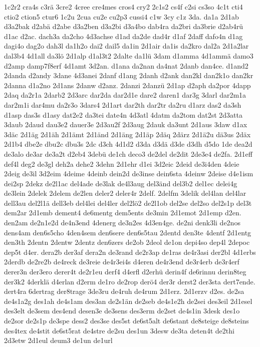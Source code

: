 {1c2r2
cra4s
c3rä
3cre2
4cree
cre4mes
cros4
cry2
2c1s2
cs4f
c2si
cs3so
4c1t
cti4
ctio2
ction5
ctur6
1c2u
2cua
cu2e
cu2p3
cussi4
c1w
3cy
c1z
3da.
da1a
2d1ab
d3a2bak
d2abä
d2abe
d3a2ben
d3a2bi
d3a4bo
dab4ra
da2bri
da3brie
d2ab4rü
d1ac
d2ac.
dach3a
da2cho
4d3achse
d1ad
da2de
dad4r
d1af
2daff
dafo4n
d1ag
dagi4o
dag2o
dah3l
da1h2o
dai2
dail5
da1in
2d1air
da1is
da2kro
dal2a
2d1a2lar
dal3b4
4d1all
da3lö
2d1alp
d1al3t2
2dalte
da1lü
3dam
d1amma
4d1ammä
damo3
d2amp
damp7f8erf
4d1amt
3d2an.
d1ana
da2nan
da4nat
2danb
dan4ce.
d1and2
2danda
d2andy
3dane
4d3anei
2danf
d1ang
2danh
d2ank
dan2kl
dan2k1o
dan2kr
2danna
d1a2no
2d1ans
2danw
d2anz.
2danzi
2danzü
2d1ap
d2aph
da2por
4dapp
2daq
da2r1a
2darb2
2d3arc
dar2da
dar2d1e
dare2
daren1
dar3g
3darl
dar2m1a
dar2m1i
dar4mu
da2r3o
3dars4
2d1art
dar2th
dar2tr
da2ru
d1arz
das2
da3sh
d1asp
das3s
d1asy
dat2e2
da3tei
date4n
4d3atl
4datm
da2tom
dat2st
2d3atta
3daub
2daud
dau3e2
dauer3e
2d3au2f
2d3aug
2dauk
da3unt
2d1aus
3daw
d1ax
3däc
2d1äg
2d1äh
2d1ämt
2d1änd
2d1äng
2d1äp
2däq
2därz
2d1ä2u
dä3us
2däx
2d1b4
dbe2e
dbu2c
dbu3s
2dc
d3ch
4d1d2
d3da
d3dä
d3de
d3dh
d5do
1de
dea2d
de3alo
de3ar
de3a2t
d2eb4
3debü
de1ch
deco3
de2del
de2dit
2de3e4
de2fa.
2d1eff
def4l
deg2
de3gl
deh2a
dehe2
3dehn
2d1ehr
d1ei
3d2eic
2deid
de3i4den
4deie
2deig
de3il
3d2eim
4deime
4deinb
dein2d
de3inse
dein6sta
4deinw
2deise
d4e1ism
dei2sp
2dekz
de2l1ac
del4ade
de3lak
de4l3aug
del3änd
del3b2
del1ec
delei4g
de3lein
2delek
2delem
de2len
deler2
deler4r
2delf.
2delfm
3delik
del4lan
del4lar
dell3au
del2l1ä
dell3eb
del4lei
del4ler
del2lö2
de2l1ob
del2se
del2so
del2s1p
del3t
dem2ar
2d1emb
dement4
de6mentg
dem5ents
de3min
2d1emot
2d1emp
d2en.
den2am
de2n1e2d
de4n3end
4denerg
de3n2es
4d3en4ge.
de2ni
denk3li
de2nos
dens4am
den6s5cho
4den4sem
den6sere
den6s5tau
2dentd
den3te
4dentf
2d1entg
den3th
2dentn
2dentw
2dentz
den6zers
de2ob
2deol
de1on
depi4so
dep4l
2depoc
dep5t
d4er.
dera2b
der3af
dera2n
de3rand
de2r3ap
de1ras
de4r3asi
der2bl
4d1erbs
2derdb
de2re2b
de4reck
de3reie
de4r3ei4s
d4eren
de4r3end
de3r4erb
de3r4erf
derer3n
der3ero
derer4t
de2r1eu
derf4
d4erfl
d2erhü
derin4f
de6rinnu
derin8teg
der3k2
4derklä
d4erlan
d2erm
de1ro
de2rop
derö4
der3r
derst2
der3sta
dert7ende.
dert4ra
6dertrag
der8trage
3de3ru
de4ruh
de4rum
2d1erz.
2d1erzv
d2es.
de2sa
de4s1a2g
des1ah
de4s1am
des3an
de2s1än
de2seb
de4s1e2h
de2sei
des3eil
2d1esel
des3elt
de3sem
des4end
desen3e
de3sens
des3erm
de2set
de4s1in
3desk
des1o
de2sor
de2s1p
de3spe
dess2
des3se
des5st
de6st5alt
de6stant
de8steige
de8steins
des4tex
de4stit
de6st5rat
de4stre
de2su
des1un
3desw
de3ta
deten4t
de2thi
2d3etw
2d1eul
deum3
de1un
de1url
}
